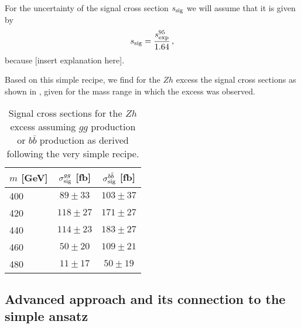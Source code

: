 \documentclass[12pt]{article}
\begin{document}
\begin{appendices}
For the uncertainty of the signal cross section $s_{\rm sig}$
we will assume that it is given by
\begin{equation}
s_{\rm sig} = \frac{s_{\rm exp}^{95}}{1.64} \, ,
\end{equation}
because [insert explanation here].

Based on this simple recipe, we find for the $Zh$ excess the
signal cross sections as shown in , given for the
mass range in which the excess was observed.
\begin{table}
\centering
\begin{tabular}{l|cc}
$m$ [GeV] & $\sigma_{\rm sig}^{gg}$ [fb] & $\sigma_{\rm sig}^{b \bar b}$ [fb] \\
\hline
400 & $ 89 \pm 33$ & $103 \pm 37$ \\
420 & $118 \pm 27$ & $171 \pm 27$ \\
440 & $114 \pm 23$ & $183 \pm 27$ \\
460 & $ 50 \pm 20$ & $109 \pm 21$ \\
480 & $ 11 \pm 17$ & $ 50 \pm 19$
\end{tabular}
\caption{Signal cross sections for the $Zh$ excess assuming $gg$ production
or $b \bar b$ production as derived following the very simple recipe.}
\label{zhsimple}
\end{table}



\subsection{Advanced approach and its connection to the simple ansatz}


\end{appendices}
\end{document}
